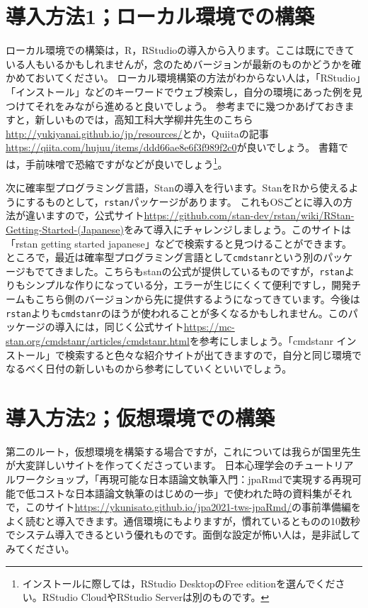 \documentclass{ltjsbook}
\begin{document}
\section{導入方法1；ローカル環境での構築}

ローカル環境での構築は，R，RStudioの導入から入ります。ここは既にできている人もいるかもしれませんが，念のためバージョンが最新のものかどうかを確かめておいてください。
ローカル環境構築の方法がわからない人は，「RStudio」「インストール」などのキーワードでウェブ検索し，自分の環境にあった例を見つけてそれをみながら進めると良いでしょう。
参考までに幾つかあげておきますと，新しいものでは，高知工科大学柳井先生のこちら\url{http://yukiyanai.github.io/jp/resources/}とか，Quiitaの記事\url{https://qiita.com/hujuu/items/ddd66ae8e6f3f989f2c0}が良いでしょう。
書籍では，手前味噌で恐縮ですが\citet{kosugi2019}などが良いでしょう\footnote{インストールに際しては，RStudio DesktopのFree editionを選んでください。RStudio CloudやRStudio Serverは別のものです。}。

次に確率型プログラミング言語，Stanの導入を行います。StanをRから使えるようにするものとして，\texttt{rstan}パッケージがあります。
これもOSごとに導入の方法が違いますので，公式サイト\url{https://github.com/stan-dev/rstan/wiki/RStan-Getting-Started-(Japanese)}をみて導入にチャレンジしましょう。このサイトは「rstan getting started japanese」などで検索すると見つけることができます。
ところで，最近は確率型プログラミング言語として\texttt{cmdstanr}という別のパッケージもでてきました。こちらもstanの公式が提供しているものですが，\texttt{rstan}よりもシンプルな作りになっている分，エラーが生じにくくて便利ですし，開発チームもこちら側のバージョンから先に提供するようになってきています。今後は\texttt{rstan}よりも\texttt{cmdstanr}のほうが使われることが多くなるかもしれません。このパッケージの導入には，同じく公式サイト\url{https://mc-stan.org/cmdstanr/articles/cmdstanr.html}を参考にしましょう。「cmdstanr インストール」で検索すると色々な紹介サイトが出てきますので，自分と同じ環境でなるべく日付の新しいものから参考にしていくといいでしょう。

\section{導入方法2；仮想環境での構築}

第二のルート，仮想環境を構築する場合ですが，これについては我らが国里先生が大変詳しいサイトを作ってくださっています。
日本心理学会のチュートリアルワークショップ，「再現可能な日本語論文執筆入門：jpaRmdで実現する再現可能で低コストな日本語論文執筆のはじめの一歩」で使われた時の資料集がそれで，このサイト\url{https://ykunisato.github.io/jpa2021-tws-jpaRmd/}の事前準備編をよく読むと導入できます。通信環境にもよりますが，慣れているとものの10数秒でシステム導入できるという優れものです。面倒な設定が怖い人は，是非試してみてください。
\end{document}

